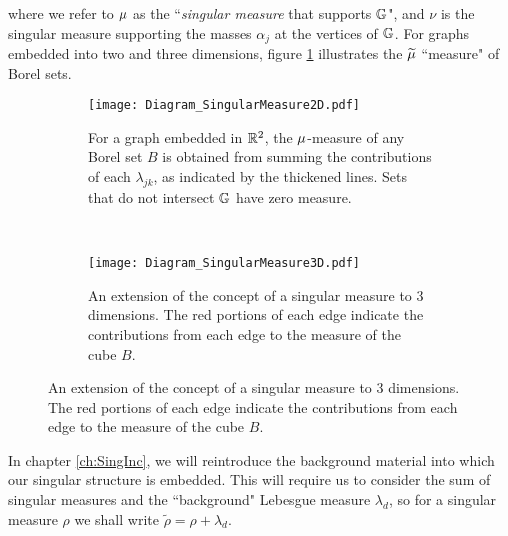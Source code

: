 where we refer to $\mu$ as the ``\emph{singular measure} that supports $\mathbb{G}$", and $\nu$ is the singular measure supporting the masses $\alpha_j$ at the vertices of $\mathbb{G}$.
For graphs embedded into two and three dimensions, figure \ref{fig:Diagram_SingularMeasure2D} illustrates the $\widetilde{\mu}$ ``measure" of Borel sets.
\begin{figure}[b!]
	\centering
	\begin{subfigure}[t]{0.45\textwidth}
		\centering
		\texttt{[image: Diagram\_SingularMeasure2D.pdf]}
		\caption{\label{fig:Diagram_SingularMeasure2D} For a graph embedded in $\mathbb{R}^2$, the $\mu$-measure of any Borel set $B$ is obtained from summing the contributions of each $\lambda_{jk}$, as indicated by the thickened lines. Sets that do not intersect $\mathbb{G}$ have zero measure.}
	\end{subfigure}
	~
	\begin{subfigure}[t]{0.45\textwidth}
		\centering
		\texttt{[image: Diagram\_SingularMeasure3D.pdf]}
		\caption{\label{fig:Diagram_SingularMeasure3D} An extension of the concept of a singular measure to 3 dimensions. The red portions of each edge indicate the contributions from each edge to the measure of the cube $B$.}
	\end{subfigure}
\end{figure}
In chapter \ref{ch:SingInc}, we will reintroduce the background material into which our singular structure is embedded.
This will require us to consider the sum of singular measures and the ``background" Lebesgue measure $\lambda_d$, so for a singular measure $\rho$ we shall write  $\tilde{\rho} = \rho + \lambda_d$.